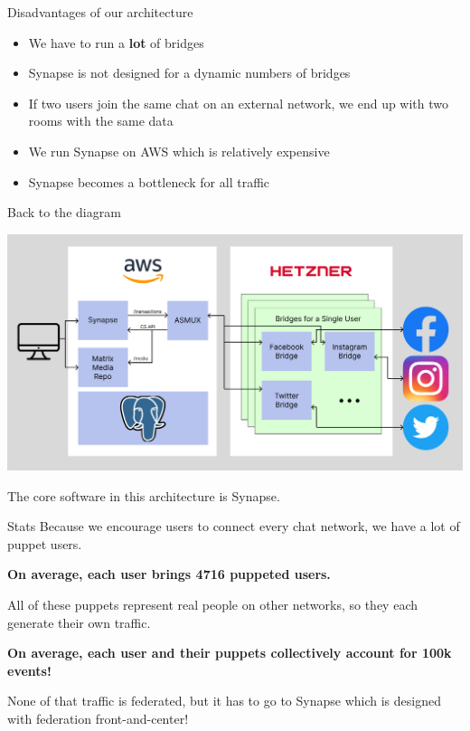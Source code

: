 \documentclass{beeper}
\begin{document}
\begin{frame}{Disadvantages of our architecture}
    \begin{itemize}[<+->]
        \item We have to run a \textbf{lot} of bridges
        \item Synapse is not designed for a dynamic numbers of bridges
        \item If two users join the same chat on an external network, we end up
            with two rooms with the same data
        \item We run Synapse on AWS which is relatively expensive
        \item Synapse becomes a bottleneck for all traffic
    \end{itemize}
\end{frame}

\begin{frame}{Back to the diagram}
    \centerline{\includegraphics[width=1.15\textwidth]{images/current-architecture}}
    The core software in this architecture is Synapse.
\end{frame}

\begin{frame}{Stats}
    Because we encourage users to connect every chat network, we have a lot of
    puppet users.

    \textbf{\large On average, each user brings 4716 puppeted users.}
    \vspace{0.4cm}
    \pause

    All of these puppets represent real people on other networks, so they
    each generate their own traffic.

    \textbf{\large On average, each user and their puppets collectively account
        for 100k events!}
    \vspace{0.4cm}
    \pause

    None of that traffic is federated, but it has to go to Synapse which is
    designed with federation front-and-center!
\end{frame}
\end{document}
